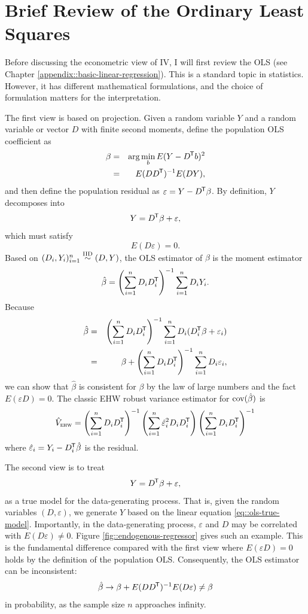 \section{Brief Review of the Ordinary Least Squares}



Before discussing the econometric view of IV, I will first review the OLS (see Chapter \ref{appendix::basic-linear-regression}). This is a standard topic in statistics. However, it has different mathematical formulations, and the choice of formulation matters for the interpretation. 

The first view is based on projection.  Given a random variable $Y$ and a random variable or vector $D$  with finite second moments, define the population OLS coefficient as
\begin{eqnarray*}
\beta  &=& \arg\min_b E(Y - D  ^{\mkern-1.5mu\mathsf{T}} b  )^2 \\
&=& E(DD^{\mkern-1.5mu\mathsf{T}})^{-1} E(DY),
\end{eqnarray*}
and then define the population residual as $\varepsilon = Y -  D  ^{\mkern-1.5mu\mathsf{T}} \beta $. By definition, $Y$ decomposes into 
\begin{eqnarray}\label{eq::olsdecomposition}
Y = D  \tran \beta  + \varepsilon,
\end{eqnarray}
which must satisfy 
$$
E(  D \varepsilon) = 0.
$$ 
Based on  $(D_i,Y_i)_{i=1}^n \stackrel{\textup{IID}}{\sim} (D, Y)$, the OLS estimator of $\beta$ is the  moment estimator
$$
\hat{\beta} = \left(  \sum_{i=1}^n D_i D_i^{\mkern-1.5mu\mathsf{T}} \right)^{-1}   \sum_{i=1}^n D_i Y_i  . 
$$
Because
\begin{eqnarray*}
\hat{\beta}  &=& \left(  \sum_{i=1}^n D_i D_i^{\mkern-1.5mu\mathsf{T}} \right)^{-1}  \sum_{i=1}^n D_i ( D_i^{\mkern-1.5mu\mathsf{T}} \beta + \varepsilon_i   )  \\
&=& \beta + \left(  \sum_{i=1}^n D_i D_i^{\mkern-1.5mu\mathsf{T}} \right)^{-1} \sum_{i=1}^n D_i  \varepsilon_i   ,
\end{eqnarray*}
we can show that $\hat{\beta}$ is consistent for $\beta$ by the law of large numbers and the fact $E(\varepsilon D) = 0.$ 
The classic EHW robust variance estimator for $\textup{cov}(\hat\beta)$ is
$$
\hat{V}_\textsc{ehw} = \left(  \sum_{i=1}^n D_i D_i^{\mkern-1.5mu\mathsf{T}} \right)^{-1}
\left(  \sum_{i=1}^n \hat{\varepsilon}_i^2 D_i D_i^{\mkern-1.5mu\mathsf{T}} \right)
\left(  \sum_{i=1}^n D_i D_i^{\mkern-1.5mu\mathsf{T}} \right)^{-1}
$$
where $\hat{\varepsilon}_i  = Y_i - D_i^{\mkern-1.5mu\mathsf{T}} \hat{\beta}$ is the residual. 




The second view is to treat
\begin{eqnarray}\label{eq::ols-true-model}
Y = D  \tran \beta  + \varepsilon,
\end{eqnarray}
as a true model for the data-generating process. 
That is, given the random variables $(D, \varepsilon)$, we generate $Y$ based on the linear equation \eqref{eq::ols-true-model}.
Importantly, in the data-generating process, $\varepsilon$ and $D$ may be correlated with $E( D \varepsilon) \neq  0$.  Figure \ref{fig::endogenous-regressor} gives such an example. This is the fundamental difference compared with the first view where $E(\varepsilon D) = 0$ holds by the definition of the population OLS. 
Consequently, the OLS estimator can be inconsistent:
$$
\hat{\beta} \rightarrow \beta + E(DD^{\mkern-1.5mu\mathsf{T}})^{-1} E(D\varepsilon) \neq \beta 
$$
in probability, as the sample size $n$ approaches infinity. 


